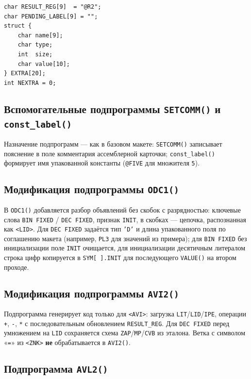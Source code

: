 \documentclass[a4paper,14pt]{extarticle}
\begin{document}
\begin{lstlisting}[style=Cstyle,caption={Глобальные переменные (фрагмент)},label=lst:globals4]
char RESULT_REG[9]  = "@R2";
char PENDING_LABEL[9] = "";
struct {
    char name[9];
    char type;
    int  size;
    char value[10];
} EXTRA[20];
int NEXTRA = 0;
\end{lstlisting}

\subsection{Вспомогательные подпрограммы \texttt{SETCOMM()} и \texttt{const\_label()}}

Назначение подпрограмм — как в базовом макете: \texttt{SETCOMM()} записывает пояснение в поле комментария ассемблерной карточки;
\texttt{const\_label()} формирует имя упакованной константы (\texttt{@FIVE} для множителя \texttt{5}).

\subsection{Модификация подпрограммы \texttt{ODC1()}}

В \texttt{ODC1()} добавляется разбор объявлений без скобок с разрядностью: ключевые слова \texttt{BIN FIXED} / \texttt{DEC FIXED},
признак \texttt{INIT}, в скобках — цепочка, распознанная как \texttt{<LID>}. Для \texttt{DEC FIXED} задаётся тип \texttt{'D'} и
длина упакованного поля по соглашению макета (например, \texttt{PL3} для значений из примера); для \texttt{BIN FIXED} без инициализации
поле \texttt{INIT} очищается, для инициализации десятичным литералом строка цифр копируется в \texttt{SYM[ ].INIT} для последующего
\texttt{VALUE()} на втором проходе.

\subsection{Модификация подпрограммы \texttt{AVI2()}}

Подпрограмма генерирует код только для \texttt{<AVI>}: загрузка \texttt{LIT}/\texttt{LID}/\texttt{IPE}, операции \texttt{+}, \texttt{-}, \texttt{*}
с последовательным обновлением \texttt{RESULT\_REG}. Для \texttt{DEC FIXED} перед умножением на \texttt{LID} сохраняется схема
\texttt{ZAP}/\texttt{MP}/\texttt{CVB} из эталона. Ветка с символом «\texttt{=}» из \texttt{<ZNK>} \textbf{не} обрабатывается в \texttt{AVI2()}.

\subsection{Подпрограмма \texttt{AVL2()}}
\end{document}
